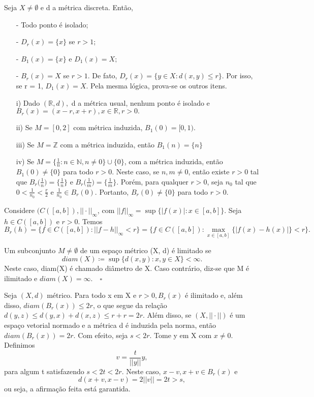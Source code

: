 \documentclass[metric_notes.tex]{subfiles}
\begin{document}
\begin{example}
	Seja \(X \neq\emptyset\) e d a métrica discreta. Então,
	\begin{itemize}
		\item[-] Todo ponto é isolado;
		\item[-] \(D_{r}(x) = \{x\}\) se \(r > 1\);
		\item[-] \(B_{1}(x) = \{x\}\) e \(D_{1}(x) = X;\)
		\item[-] \(B_{r}(x) = X\) se \(r > 1\).
		      De fato, \(D_{r}(x) = \{y\in X: d(x, y)\leq r\}.\) Por isso, se r = 1, \(D_{1}(x) = X.\) Pela mesma lógica, prova-se os outros itens.
	\end{itemize}
\end{example}
\begin{example}
	\begin{itemize}
		\item[i)] Dado \((\mathbb{R}, d),\) d a métrica usual, nenhum ponto é isolado e \(B_{r}(x) = (x-r, x+r), x\in \mathbb{R}, r > 0.\)
		\item[ii)] Se \(M=[0, 2]\) com métrica induzida, \(B_{1}(0) = [0, 1).\)
		\item[iii)] Se \(M=\mathbb{Z}\) com a métrica induzida, então \(B_{1}(n) = \{n\}\)
		\item[iv)] Se \(M=\{\frac{1}{n}:n\in \mathbb{N}, n\neq0\}\cup\{0\}\), com a métrica induzida, então \(B_{1}(0)\neq\{0\}\) para todo \(r>0.\)
		      Neste caso, se \(n, m\neq 0\), então existe \(r > 0\) tal que \(B_{r}\biggl(\frac{1}{n}\biggr)=\{\frac{1}{n}\}\) e \(B_{r}\biggl(\frac{1}{m}\biggr)=\{\frac{1}{m}\}.\) Porém,
		      para qualquer \(r> 0\), seja \(n_{0}\) tal que \(0 < \frac{1}{n_{0}} < \frac{r}{2}\) e \(\frac{1}{n_{0}}\in B_{r}(0).\) Portanto, \(B_{r}(0)\neq\{0\}\) para todo \(r> 0\).
	\end{itemize}
\end{example}
\begin{example}
	Considere \((C([a, b]), ||\cdot ||_{\infty}\), com \(||f||_{\infty} = \sup\{|f(x)|: x\in[a, b]\}.\) Seja
	\(h\in C([a, b])\) e \(r > 0\). Temos
	\[
		B_{r}(h) = \{f\in C([a, b]): ||f-h||_{\infty} < r\} = \{f\in C([a, b]):\max_{x\in[a, b]}\{|f(x)-h(x)|\} < r\}.
	\]
\end{example}
\begin{def*}
	Um subconjunto \(M \neq\emptyset\) de um espaço métrico (X, d) é limitado se
	\[
		diam(X)\coloneqq \sup\{d(x, y):x, y\in X\} < \infty.
	\]
	Neste caso, diam(X) é chamado diâmetro de X. Caso contrário, diz-se que M é ilimitado e \(diam(X) = \infty.\quad\square\)
\end{def*}
\begin{example}
	Seja \((X, d)\) métrico. Para todo x em X e \(r>0, B_{r}(x)\) é ilimitado e, além disso, \(diam(B_{r}(x))\leq 2r\), o que segue da relação
	\(d(y, z)\leq d(y, x) + d(x, z)\leq r + r = 2r.\) Além disso, se \((X, ||\cdot ||)\) é um espaço vetorial normado e a métrica d é induzida pela norma,
	então \(diam(B_{r}(x)) = 2r.\) Com efeito, seja \(s < 2r.\) Tome y em X com \(x\neq0.\) Definimos
	\[
		v = \frac{t}{||y||}y,
	\]
	para algum t satisfazendo \(s < 2t < 2r.\) Neste caso, \(x-v, x+v\in B_{r}(x)\)  e
	\[
		d(x+v, x-v) = 2||v|| = 2t > s,
	\]
	ou seja, a afirmação feita está garantida.
\end{example}
\end{document}
